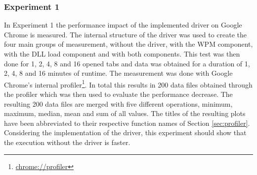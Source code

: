 \subsubsection{Experiment 1}
In Experiment 1 the performance impact of the implemented driver on Google Chrome is measured. The internal structure of the driver was used to create the four main groups of measurement, without the driver, with the \gls{WPM} component, with the \gls{DLL} load component and with both components. This test was then done for 1, 2, 4, 8 and 16 opened tabs and data was obtained for a duration of 1, 2, 4, 8 and 16 minutes of runtime. The measurement was done with Google Chrome's internal profiler\footnote{\url{chrome://profiler}}. In total this results in 200 data files obtained through the profiler which was then used to evaluate the performance decrease. The resulting 200 data files are merged with five different operations, minimum, maximum, median, mean and sum of all values. The titles of the resulting plots have been abbreviated to their respective function names of Section \ref{sec:profiler}. Considering the implementation of the driver, this experiment should show that the execution without the driver is faster.
